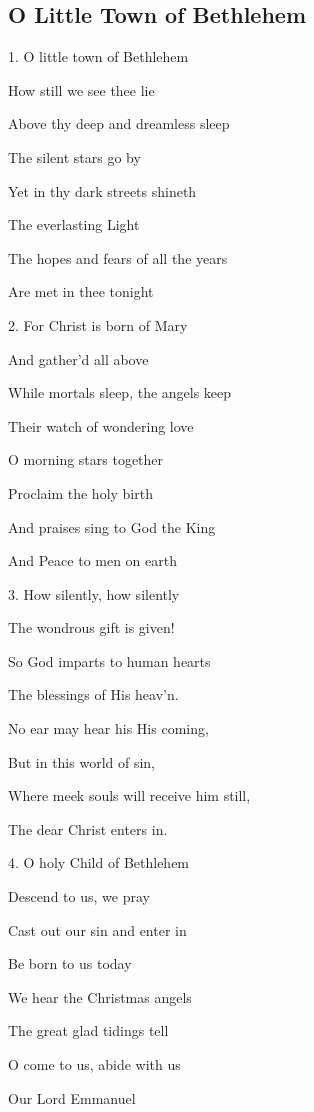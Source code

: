 \subsection{O Little Town of Bethlehem}\label{o_little_town}
\begin{description}[nosep,leftmargin=\parindent,labelsep=0pt]
\item 1. O little town of Bethlehem 
\item How still we see thee lie 
\item Above thy deep and dreamless sleep 
\item The silent stars go by 
\item Yet in thy dark streets shineth 
\item The everlasting Light 
\item The hopes and fears of all the years 
\item Are met in thee tonight 
\vspace{1.5ex}
\item 2. For Christ is born of Mary 
\item And gather’d all above 
\item While mortals sleep, the angels keep 
\item Their watch of wondering love 
\item O morning stars together 
\item Proclaim the holy birth 
\item And praises sing to God the King 
\item And Peace to men on earth 
\vspace{1.5ex}
\item 3. How silently, how silently 
\item The wondrous gift is given! 
\item So God imparts to human hearts 
\item The blessings of His heav’n. 
\item No ear may hear his His coming, 
\item But in this world of sin, 
\item Where meek souls will receive him still, 
\item The dear Christ enters in. 
\vspace{1.5ex}
\item 4. O holy Child of Bethlehem 
\item Descend to us, we pray 
\item Cast out our sin and enter in 
\item Be born to us today 
\item We hear the Christmas angels 
\item The great glad tidings tell 
\item O come to us, abide with us 
\item Our Lord Emmanuel 
\end{description}
